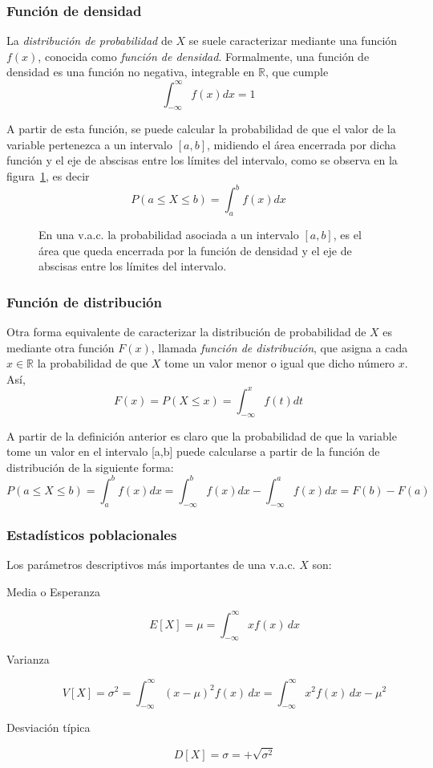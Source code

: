 \subsubsection{Función de densidad}
La \emph{distribución de probabilidad} de $X$ se suele caracterizar
mediante una función $f(x)$, conocida como \emph{función de
densidad}. Formalmente, una función de densidad es una función no
negativa, integrable en $\mathbb{R}$, que cumple
\[
\int_{ - \infty }^\infty  {f(x)dx = 1}
\]

A partir de esta función, se puede calcular la probabilidad de que
el valor de la variable pertenezca a un intervalo $[a,b]$, midiendo
el área encerrada por dicha función y el eje de abscisas entre los
límites del intervalo, como se observa en la
figura~\ref{g:probabilidadintervalo}, es decir
\[
P(a \le X \le b) = \int_a^b {f(x)dx}
\]

\begin{figure}[h!]
  \centering
  \scalebox{0.8}{} 
  \caption{En una v.a.c. la probabilidad asociada a un intervalo $[a,b]$, es el área que queda encerrada por
  la función de densidad y el eje de abscisas entre los límites del intervalo.}\label{g:probabilidadintervalo}
\end{figure}


\subsubsection{Función de distribución}
Otra forma equivalente de caracterizar la distribución de
probabilidad de $X$ es mediante otra función $F(x)$, llamada
\emph{función de distribución}, que asigna a cada $x\in \mathbb{R}$
la probabilidad de que $X$ tome un valor menor o igual que dicho
número $x$. Así,
\[
F(x) = P(X \le x) = \int_{ - \infty }^x {f(t)dt}
\]

A partir de la definición anterior es claro que la probabilidad de que la variable tome un valor en el
intervalo [a,b] puede calcularse a partir de la función de distribución de la siguiente forma:
\[
P(a \le X \le b) = \int_a^b {f(x)dx = } \int_{ - \infty }^b {f(x)dx - } \int_{ - \infty }^a {f(x)dx = } F(b) - F(a)
\]


\subsubsection{Estadísticos poblacionales}
Los parámetros descriptivos más importantes de una v.a.c. $X$ son:
\begin{description}
\item [Media o Esperanza]
\[
E[X]=\mu  = \int_{ - \infty }^\infty  {xf(x)\,dx}
\]

\item [Varianza]
\[
V[X]=\sigma ^2  = \int_{ - \infty }^\infty {(x - \mu )^2 f(x)\,dx =
} \int_{ - \infty }^\infty  {x^2  f(x)\,dx - \mu ^2 }
\]

\item [Desviación típica]
\[
D[X]=\sigma  =  + \sqrt {\sigma ^2 }
\]
\end{description}

